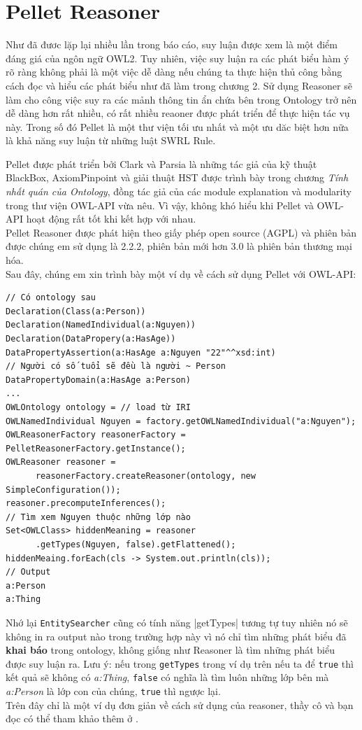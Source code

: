 \section{Pellet Reasoner}
Như đã đươc lặp lại nhiều lần trong báo cáo, suy luận được xem là một điểm đáng giá của ngôn ngữ OWL2. Tuy nhiên, việc suy luận ra các phát biểu hàm ý rõ ràng không phải là một việc dễ dàng nếu chúng ta thực hiện thủ công bằng cách đọc và hiểu các phát biểu như đã làm trong chương 2. Sử dụng Reasoner sẽ làm cho công việc suy ra các mảnh thông tin ẩn chứa bên trong Ontology trở nên dễ dàng hơn rất nhiều, có rất nhiều reaoner được phát triển để thực hiện tác vụ này. Trong số đó Pellet \cite{pellet} là một thư viện tối ưu nhất và  một ưu dăc biệt hơn nữa là  khả năng suy luận từ những luật SWRL Rule.

Pellet được phát triển bởi Clark và Parsia \cite{repair} \cite{axiomPinpoint} là những tác giả của kỹ thuật BlackBox, AxiomPinpoint và giải thuật HST được trình bày trong chương \textit{Tính nhất quán của Ontology}, đồng tác giả của các module explanation và modularity trong thư viện OWL-API vừa nêu. Vì vậy, không khó hiểu khi Pellet và OWL-API hoạt động rất tốt khi kết hợp với nhau.
\\
Pellet Reasoner được phát hiện theo giấy phép open source (AGPL) và phiên bản được chúng em sử dụng là 2.2.2, phiên bản mới hơn 3.0 là phiên bản thương mại hóa.
\\
Sau đây, chúng em xin trình bày một ví dụ về cách sử dụng Pellet với OWL-API:
\begin{verbatim}
// Có ontology sau
Declaration(Class(a:Person))
Declaration(NamedIndividual(a:Nguyen))
Declaration(DataPropery(a:HasAge))
DataPropertyAssertion(a:HasAge a:Nguyen "22"^^xsd:int)
// Người có số tuổi sẽ đều là người ~ Person
DataPropertyDomain(a:HasAge a:Person)
...
OWLOntology ontology = // load từ IRI 
OWLNamedIndividual Nguyen = factory.getOWLNamedIndividual("a:Nguyen"); 
OWLReasonerFactory reasonerFactory = PelletReasonerFactory.getInstance();
OWLReasoner reasoner = 
      reasonerFactory.createReasoner(ontology, new SimpleConfiguration());
reasoner.precomputeInferences();
// Tìm xem Nguyen thuộc những lớp nào
Set<OWLClass> hiddenMeaning = reasoner
      .getTypes(Nguyen, false).getFlattened();
hiddenMeaing.forEach(cls -> System.out.println(cls));
// Output
a:Person
a:Thing
\end{verbatim}
Nhớ lại \verb|EntitySearcher| cũng có tính năng |getTypes| tương tự tuy nhiên nó sẽ không in ra output nào trong trường hợp này vì nó chỉ tìm những phát biểu đã \textbf{khai báo} trong ontology, không giống như Reasoner là tìm những phát biểu được suy luận ra. Lưu ý: nếu trong \verb|getTypes| trong ví dụ trên nếu ta để \verb|true| thì kết quả sẽ không có \textit{a:Thing}, \verb|false| có nghĩa là tìm luôn những lớp bên mà \textit{a:Person} là lớp con của chúng, \verb|true| thì ngược lại.
\\
Trên đây chỉ là một ví dụ đơn giản về cách sử dụng của reasoner, thầy cô và bạn đọc có thể tham khảo thêm ở \cite{pellet}.


